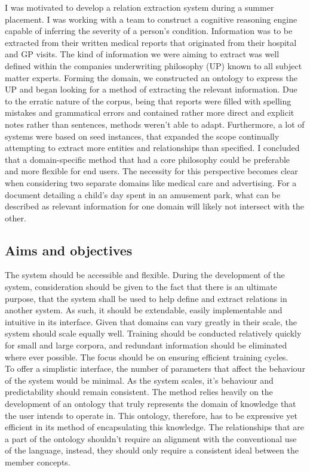 \documentclass[12pt]{article} %
\begin{document}
I was motivated to develop a relation extraction system during a summer placement. I was working with a team to construct a cognitive reasoning engine capable of inferring the severity of a person’s condition. Information was to be extracted from their written medical reports that originated from their hospital and GP visits. The kind of information we were aiming to extract was well defined within the companies underwriting philosophy (UP) known to all subject matter experts. Forming the domain, we constructed an ontology to express the UP and began looking for a method of extracting the relevant information. Due to the erratic nature of the corpus, being that reports were filled with spelling mistakes and grammatical errors and contained rather more direct and explicit notes rather than sentences, methods weren’t able to adapt. Furthermore, a lot of systems were based on seed instances, that expanded the scope continually attempting to extract more entities and relationships than specified. I concluded that a domain-specific method that had a core philosophy could be preferable and more flexible for end users. The necessity for this perspective becomes clear when considering two separate domains like medical care and advertising. For a document detailing a child’s day spent in an amusement park, what can be described as relevant information for one domain will likely not intersect with the other. 

\subsection{Aims and objectives}

The system should be accessible and flexible. During the development of the system, consideration should be given to the fact that there is an ultimate purpose, that the system shall be used to help define and extract relations in another system. As such, it should be extendable, easily implementable and intuitive in its interface. Given that domains can vary greatly in their scale, the system should scale equally well. Training should be conducted relatively quickly for small and large corpora, and redundant information should be eliminated where ever possible. The focus should be on ensuring efficient training cycles.\\

To offer a simplistic interface, the number of parameters that affect the behaviour of the system would be minimal. As the system scales, it’s behaviour and predictability should remain consistent. The method relies heavily on the development of an ontology that truly represents the domain of knowledge that the user intends to operate in. This ontology, therefore, has to be expressive yet efficient in its method of encapsulating this knowledge. The relationships that are a part of the ontology shouldn’t require an alignment with the conventional use of the language, instead, they should only require a consistent ideal between the member concepts.\\
\end{document}
